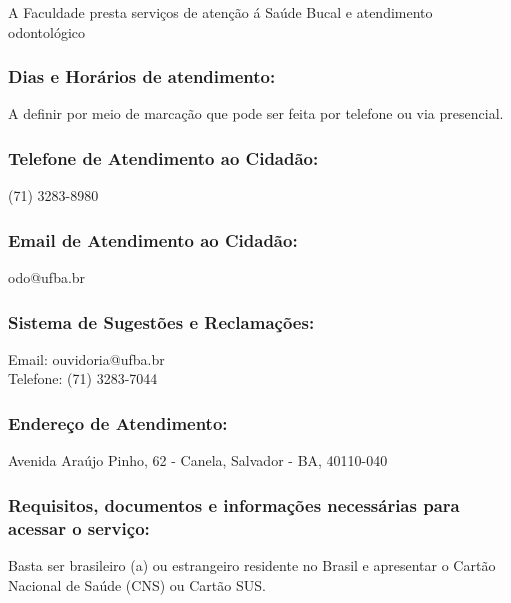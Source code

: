     A Faculdade presta serviços de atenção á Saúde Bucal e atendimento odontológico
        
    \subsubsection{Dias e Horários de atendimento:}
    A definir por meio de marcação que pode ser feita por telefone ou via presencial.
    
    \subsubsection{Telefone de Atendimento ao Cidadão:}
         (71) 3283-8980
        
    \subsubsection{Email de Atendimento ao Cidadão:}
        odo@ufba.br
        
    \subsubsection{Sistema de Sugestões e Reclamações:}
        Email: ouvidoria@ufba.br \\ Telefone: (71) 3283-7044
        
    \subsubsection{Endereço de Atendimento:}
         Avenida Araújo Pinho, 62 - Canela, Salvador - BA, 40110-040
         
    \subsubsection{Requisitos, documentos e informações necessárias para acessar o serviço:}
        Basta ser brasileiro (a) ou estrangeiro residente no Brasil e apresentar o Cartão Nacional de Saúde (CNS) ou Cartão SUS. 

    